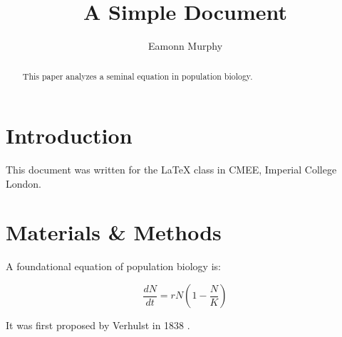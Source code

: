 \documentclass[12pt]{article}
\title{A Simple Document}
\author{Eamonn Murphy}
\date{}
\begin{document}
    \maketitle

    \begin{abstract}
        This paper analyzes a seminal equation in population biology.
    \end{abstract}

    \section{Introduction}
        This document was written for the LaTeX class in CMEE, Imperial College London.
    
    \section{Materials \& Methods}

    A foundational equation of population biology is:

    \begin{equation}
        \frac{dN}{dt} = r N (1 - \frac{N}{K})
    \end{equation}

    It was first proposed by Verhulst in 1838 \cite{verhulst1838notice}.

    

    
\end{document}

